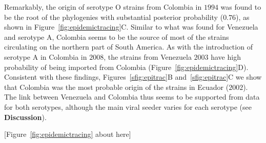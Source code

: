 \documentclass[10pt]{article}
\begin{document}
Remarkably, the origin of serotype O strains from Colombia in $1994$ was found to be the root of the phylogenies with substantial posterior probability ($0.76$), as shown in Figure~\ref{fig:epidemictracing}C.
Similar to what was found for Venezuela and serotype A, Colombia seems to be the source of most of the strains circulating on the northern part of South America.
As with the introduction of serotype A in Colombia in $2008$, the strains from Venezuela $2003$ have high probability of being imported from Colombia (Figure~\ref{fig:epidemictracing}D).
Consistent with these findings, Figures~\ref{sfig:epitrac}B and~\ref{sfig:epitrac}C we show that Colombia was the most probable origin of the strains in Ecuador ($2002$).
The link between Venezuela and Colombia thus seems to be supported from data for both serotypes, although the main viral seeder varies for each serotype (see \textbf{Discussion}).

\begin{center}
 [Figure~\ref{fig:epidemictracing} about here]
\end{center}
\end{document}
